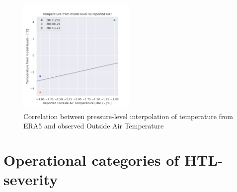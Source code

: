 \begin{figure}
    \centering
    \includegraphics[width=0.5\textwidth]{Figures/mlvsoat.pdf}
    \caption{Correlation between pressure-level interpolation of temperature from ERA5 and observed Outside Air Temperature}
    \label{fig:plvsoat}
\end{figure}


\chapter{Operational categories of HTL-severity}

